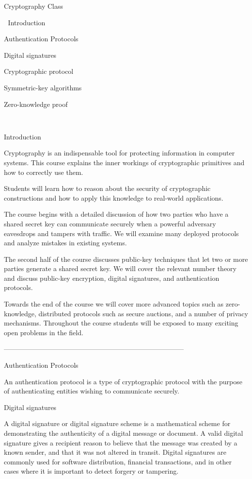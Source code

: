 
Cryptography Class


Introduction

Authentication Protocols

Digital signatures

Cryptographic protocol

Symmetric-key algorithms

Zero-knowledge proof



Introduction


Cryptography is an indispensable tool for protecting information in computer systems. This course explains the inner workings of cryptographic primitives and how to correctly use them. 


Students will learn how to reason about the security of cryptographic constructions and how to apply this knowledge to real-world applications. 


The course begins with a detailed discussion of how two parties who have a shared secret key can communicate securely when a powerful adversary eavesdrops and tampers with traffic. We will examine many deployed protocols and analyze mistakes in existing systems. 


The second half of the course discusses public-key techniques that let two or more parties generate a shared secret key. We will cover the relevant number theory and discuss public-key encryption, digital signatures, and authentication protocols. 


Towards the end of the course we will cover more advanced topics such as zero-knowledge, distributed protocols such as secure auctions, and a number of privacy mechanisms. Throughout the course students will be exposed to many exciting open problems in the field.




--------------------------------------------------------------------------------


Authentication Protocols

An authentication protocol is a type of cryptographic protocol with the purpose of authenticating entities wishing to communicate securely.

Digital signatures

A digital signature or digital signature scheme is a mathematical scheme for demonstrating the authenticity of a digital message or document. A valid digital signature gives a recipient reason to believe that the message was created by a known sender, and that it was not altered in transit. Digital signatures are commonly used for software distribution, financial transactions, and in other cases where it is important to detect forgery or tampering.



